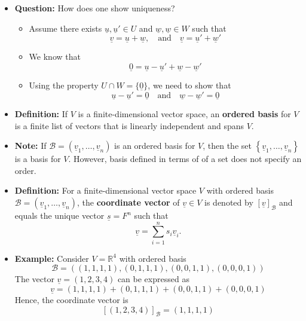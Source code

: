 \documentclass[11pt,twoside]{report}
\newcommand{\bbR}{{\mathbb{R}}}
\newcommand{\vecnot}{\underline}
\begin{document}
\begin{itemize}
\item \textbf{Question:} How does one show uniqueness? 
\begin{itemize}
\item Assume there exists $\vecnot{u}, \vecnot{u}' \in U$ and $\vecnot{w}, \vecnot{w} \in W$ such that
\[
\vecnot{v} = \vecnot{u} + \vecnot{w} , \quad \text{and} \quad  \vecnot{v} = \vecnot{u}' + \vecnot{w}' 
\]
\item We know that
\[
\vecnot{0} =  \vecnot{u}  - \vecnot{u}'  + \vecnot{w} -  \vecnot{w}'  %
\]
\item Using the property $U \cap W = \{ \vecnot{0} \}$, we need to show that 
\[
\vecnot{u}  - \vecnot{u}' = \vecnot{0} \quad \text{and} \quad  \vecnot{w}  - \vecnot{w}'  = \vecnot{0}
\] 
\end{itemize}



\item \textbf{Definition:} 
If $V$ is a finite-dimensional vector space, an \textbf{ordered basis} for $V$ is a finite list of vectors  that is linearly independent and spans $V$.


\item \textbf{Note:} If  $\mathcal{B} = (\vecnot{v}_1, \ldots, \vecnot{v}_n )$ is an ordered basis for $V$, then the set $\left\{ \vecnot{v}_1, \ldots, \vecnot{v}_n \right\}$ is a basis for $V$. However, basis defined in terms of of a set does not specify an order. 


\item  \textbf{Definition:} 
For a finite-dimensional vector space $V$ with ordered basis $\mathcal{B}=(\vecnot{v}_1, \ldots, \vecnot{v}_n )$, the \textbf{coordinate vector} of $\vecnot{v} \in V$ is denoted by $\left[ \vecnot{v} \right]_{\mathcal{B}}$ and equals the unique vector $\vecnot{s} = F^n$ such that 
\[ 
\vecnot{v} = \sum_{i=1}^n s_i \vecnot{v}_i. 
\]  


\item \textbf{Example:} Consider $V = \bbR^4$ with ordered basis 
\[
\mathcal{B} = ( (1,1,1,1),(0,1,1,1),(0,0,1,1),(0,0,0,1) )
\]
The vector $\vecnot{v} = (1,2,3,4)$ can be expressed as
\[
\vecnot{v} =  (1,1,1,1) + (0,1,1,1) + (0,0,1,1) + (0,0,0,1)
\]
Hence, the coordinate vector is 
\[
[(1,2,3,4)]_\mathcal{B} = (1,1,1,1)
\]


\end{itemize}
\end{document}
